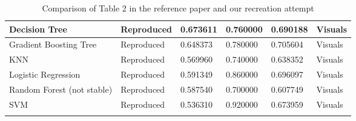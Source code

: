 \begin{table*}[h]
\begin{tabular}{|l|l|l|l|l|l|}
Decision Tree & Reproduced & 0.673611 & 0.760000 & 0.690188 & Visuals \\ \hline
Gradient Boosting Tree & Reproduced & 0.648373 & 0.780000 & 0.705604 & Visuals \\ \hline
KNN & Reproduced & 0.569960 & 0.740000 & 0.638352 & Visuals \\ \hline
Logistic Regression & Reproduced & 0.591349 & 0.860000 & 0.696097 & Visuals \\ \hline
Random Forest (not stable) & Reproduced & 0.587540 & 0.700000 & 0.607749 & Visuals \\ \hline
SVM & Reproduced & 0.536310 & 0.920000 & 0.673959 & Visuals \\ \hline
\multicolumn{6}{c}{ } \\
\end{tabular}
\caption{Comparison of Table 2 in the reference paper and our recreation attempt}
\label{table2}
\end{table*}